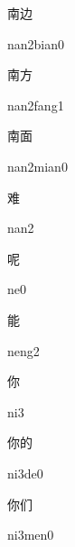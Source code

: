 \begin{multicols*}{2}
\begin{verbete}{南边}
\begin{pronuncia}{nan2bian0}
\end{pronuncia}
\end{verbete}

\begin{verbete}{南方}
\begin{pronuncia}{nan2fang1}
\end{pronuncia}
\end{verbete}

\begin{verbete}{南面}
\begin{pronuncia}{nan2mian0}
\end{pronuncia}
\end{verbete}

\begin{verbete}[nan2]{难}
\begin{pronuncia}{nan2}
\end{pronuncia}
\end{verbete}

\begin{verbete}[ne0]{呢}
\begin{pronuncia}{ne0}
\end{pronuncia}
\end{verbete}

\begin{verbete}[neng2]{能}
\begin{pronuncia}{neng2}
\end{pronuncia}
\end{verbete}

\begin{verbete}[ni3]{你}
\begin{pronuncia}{ni3}
\end{pronuncia}
\end{verbete}

\begin{verbete}[ni3de0]{你的}
\begin{pronuncia}{ni3de0}
\end{pronuncia}
\end{verbete}

\begin{verbete}[ni3men0]{你们}
\begin{pronuncia}{ni3men0}
\end{pronuncia}
\end{verbete}


\end{multicols*}
